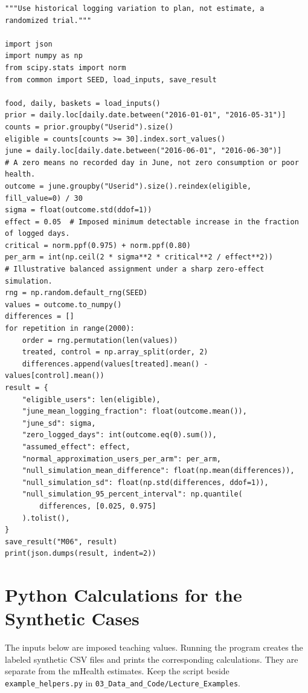 \begin{Verbatim}[breaklines,breakanywhere,fontsize=\small]
"""Use historical logging variation to plan, not estimate, a randomized trial."""

import json
import numpy as np
from scipy.stats import norm
from common import SEED, load_inputs, save_result

food, daily, baskets = load_inputs()
prior = daily.loc[daily.date.between("2016-01-01", "2016-05-31")]
counts = prior.groupby("Userid").size()
eligible = counts[counts >= 30].index.sort_values()
june = daily.loc[daily.date.between("2016-06-01", "2016-06-30")]
# A zero means no recorded day in June, not zero consumption or poor health.
outcome = june.groupby("Userid").size().reindex(eligible, fill_value=0) / 30
sigma = float(outcome.std(ddof=1))
effect = 0.05  # Imposed minimum detectable increase in the fraction of logged days.
critical = norm.ppf(0.975) + norm.ppf(0.80)
per_arm = int(np.ceil(2 * sigma**2 * critical**2 / effect**2))
# Illustrative balanced assignment under a sharp zero-effect simulation.
rng = np.random.default_rng(SEED)
values = outcome.to_numpy()
differences = []
for repetition in range(2000):
    order = rng.permutation(len(values))
    treated, control = np.array_split(order, 2)
    differences.append(values[treated].mean() - values[control].mean())
result = {
    "eligible_users": len(eligible),
    "june_mean_logging_fraction": float(outcome.mean()),
    "june_sd": sigma,
    "zero_logged_days": int(outcome.eq(0).sum()),
    "assumed_effect": effect,
    "normal_approximation_users_per_arm": per_arm,
    "null_simulation_mean_difference": float(np.mean(differences)),
    "null_simulation_sd": float(np.std(differences, ddof=1)),
    "null_simulation_95_percent_interval": np.quantile(
        differences, [0.025, 0.975]
    ).tolist(),
}
save_result("M06", result)
print(json.dumps(result, indent=2))
\end{Verbatim}

\hypertarget{M06-python-calculations-for-the-synthetic-cases}{%
\section{Python Calculations for the Synthetic
Cases}\label{M06-python-calculations-for-the-synthetic-cases}}

\noindent The inputs below are imposed teaching values. Running the program
creates the labeled synthetic CSV files and prints the corresponding
calculations. They are separate from the mHealth estimates. Keep the
script beside \texttt{example\_helpers.py} in
\texttt{03\_Data\_and\_Code/Lecture\_Examples}.

